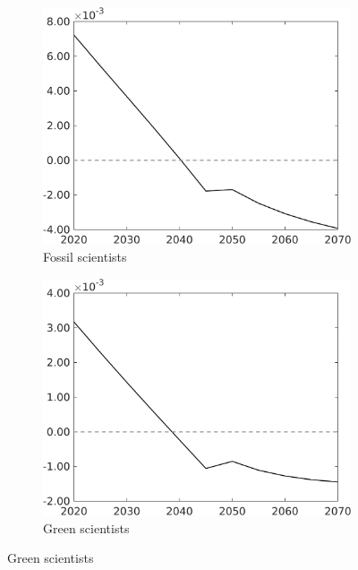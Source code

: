 \begin{figure}[h!!!]
\begin{subfigure}{0.4\textwidth}
	\end{subfigure}
	\begin{subfigure}{0.4\textwidth}
		\caption{Fossil scientists}
		\includegraphics[width=1\textwidth]{../../codding_model/own_basedOnFried/optimalPol_010922_revision/figures/all_13Sept22_Tplus30/CountTAUFPerDif_Opt_target_sff_nsk0_xgr0_knspil0_regime4_spillover0_sep0_extern0_PV1_etaa0.79.png}
	\end{subfigure}
	\begin{subfigure}{0.4\textwidth}
		\caption{Green scientists}
		\includegraphics[width=1\textwidth]{../../codding_model/own_basedOnFried/optimalPol_010922_revision/figures/all_13Sept22_Tplus30/CountTAUFPerDif_Opt_target_sg_nsk0_xgr0_knspil0_regime4_spillover0_sep0_extern0_PV1_etaa0.79.png}

\end{subfigure}
\end{figure}
